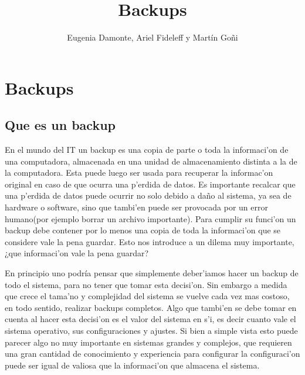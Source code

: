 \documentclass[11pt]{article}
\title{\Huge Backups}
\author{Eugenia Damonte, Ariel Fideleff y Mart\'in Go\~ni}
\date{}
\begin{document}
	\maketitle
	\newpage
	\tableofcontents
	\newpage

	
	\section{Backups}
	\subsection{Que es un backup}
		En el mundo del IT un backup es una copia de parte o toda la informaci'on de una computadora, almacenada en una unidad de almacenamiento distinta a la de la computadora. Esta puede luego ser usada para recuperar la informac'on original en caso de que ocurra una p'erdida de datos. Es importante recalcar que una p'erdida de datos puede ocurrir no solo debido a daño al sistema, ya sea de hardware o software, sino que tambi'en puede ser provocada por un error humano(por ejemplo borrar un archivo importante). Para cumplir su funci'on un backup debe contener por lo menos una copia de toda la informaci'on que se considere vale la pena guardar. Esto nos introduce a un dilema muy importante, ¿que informaci'on vale la pena guardar?

		En principio uno podría pensar que simplemente deber'iamos hacer un backup de todo el sistema, para no tener que tomar esta decisi'on. Sin embargo a medida que crece el tama'no y complejidad del sistema se vuelve cada vez mas costoso, en todo sentido, realizar backups completos. Algo que tambi'en se debe tomar en cuenta al hacer esta decisi'on es el valor del sistema en s'i, es decir cuanto vale el sistema operativo, sus configuraciones y ajustes. Si bien a simple vista esto puede parecer algo no muy importante en sistemas grandes y complejos, que requieren una gran cantidad de conocimiento y experiencia para configurar la configuraci'on puede ser igual de valiosa que la informaci'on que almacena el sistema.
\end{document}
